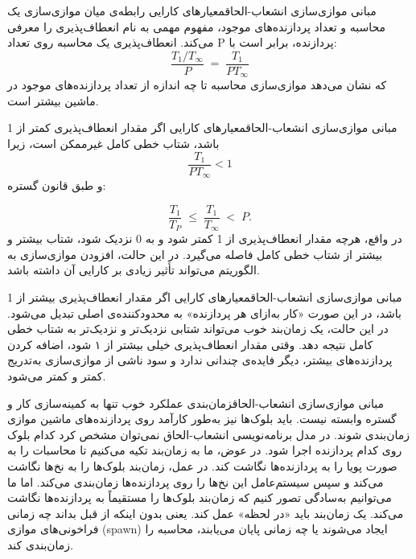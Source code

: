 \begin{itemframe-s}{مبانی موازی‌سازی انشعاب-الحاق}{معیارهای کارایی}
\itm
رابطه‌ی میان موازی‌سازی یک محاسبه و تعداد پردازنده‌های موجود، مفهوم مهمی به نام انعطاف‌پذیری
را معرفی می‌کند.
\itm
انعطاف‌پذیری یک محاسبه روی تعداد P
پردازنده، برابر است با:
$$\frac{T_1 / T_\infty}{P} \;=\; \frac{T_1}{P T_\infty}$$
که نشان می‌دهد موازی‌سازی محاسبه تا چه اندازه از تعداد پردازنده‌های موجود در ماشین بیشتر است.

\end{itemframe-s}


\begin{itemframe-s}{مبانی موازی‌سازی انشعاب-الحاق}{معیارهای کارایی}
\itm
اگر مقدار انعطاف‌پذیری کمتر از 1 باشد، شتاب خطی کامل غیرممکن است، زیرا
$$\frac{T_1}{P T_\infty} < 1$$
و طبق قانون گستره:

$$\frac{T_1}{T_P} \;\leq\; \frac{T_1}{T_\infty} \;<\; P.$$
\itm
در واقع، هرچه مقدار انعطاف‌پذیری از 1 کمتر شود و به 0 نزدیک شود، شتاب بیشتر و بیشتر از شتاب خطی کامل فاصله می‌گیرد.
در این حالت، افزودن موازی‌سازی به الگوریتم می‌تواند تأثیر زیادی بر کارایی آن داشته باشد.
\end{itemframe-s}


\begin{itemframe-s}{مبانی موازی‌سازی انشعاب-الحاق}{معیارهای کارایی}
\itm
اگر مقدار انعطاف‌پذیری بیشتر از 1 باشد، در این صورت «کار به‌ازای هر پردازنده» به محدودکننده‌ی اصلی تبدیل می‌شود.
در این حالت، یک زمان‌بند خوب می‌تواند شتابی نزدیک‌تر و نزدیک‌تر به شتاب خطی کامل نتیجه دهد.
\itm
وقتی مقدار انعطاف‌پذیری خیلی بیشتر از ۱ شود، اضافه کردن پردازنده‌های بیشتر، دیگر فایده‌ی چندانی ندارد و سود ناشی از موازی‌سازی به‌تدریج کمتر و کمتر می‌شود.
\end{itemframe-s}


\begin{itemframe-s}{مبانی موازی‌سازی انشعاب-الحاق}{زمان‌بندی}
\itm
عملکرد خوب تنها به کمینه‌سازی کار و گستره وابسته نیست.
باید بلوک‌ها نیز به‌طور کارآمد روی پردازنده‌های ماشین موازی زمان‌بندی شوند.
\itm
در مدل برنامه‌نویسی انشعاب-الحاق نمی‌توان مشخص کرد کدام بلوک روی کدام پردازنده اجرا شود.
در عوض، ما به زمان‌بند تکیه می‌کنیم تا محاسبات را به صورت پویا را به پردازنده‌ها نگاشت کند.
\itm
در عمل، زمان‌بند بلوک‌ها را به نخ‌ها نگاشت می‌کند و سپس سیستم‌عامل این نخ‌ها را روی پردازنده‌ها زمان‌بندی می‌کند.
اما ما می‌توانیم به‌سادگی تصور کنیم که زمان‌بند بلوک‌ها را مستقیماً به پردازنده‌ها نگاشت می‌کند.
\itm
یک زمان‌بند باید «در لحظه»
عمل کند. یعنی بدون اینکه از قبل بداند
چه زمانی فراخونی‌های موازی (spawn) ایجاد می‌شوند یا چه زمانی پایان می‌یابند، محاسبه را زمان‌بندی کند.
\end{itemframe-s}


